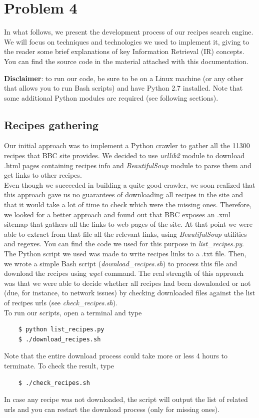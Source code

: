 
\section{Problem 4}

In what follows, we present the development process of our recipes search engine. We will focus on techniques and technologies we used to implement it, giving to the reader some brief explanations of key Information Retrieval (IR) concepts. You can find the source code in the material attached with this documentation.\medskip

\noindent\textbf{Disclaimer}: to run our code, be sure to be on a Linux machine (or any other that allows you to run Bash scripts) and have Python 2.7 installed. Note that some additional Python modules are required (see following sections).


\subsection{Recipes gathering}

Our initial approach was to implement a Python crawler to gather all the 11300 recipes that BBC site\cite{bbc} provides. We decided to use \textit{urllib2}\cite{urllib2} module to download .html pages containing recipes info and \textit{BeautifulSoup}\cite{beaut_soup} module to parse them and get links to other recipes.\\
Even though we succeeded in building a quite good crawler, we soon realized that this approach gave us no guarantees of downloading all recipes in the site and that it would take a lot of time to check which were the missing ones. Therefore, we looked for a better approach and found out that BBC exposes an .xml sitemap that gathers all the links to web pages of the site. At that point we were able to extract from that file all the relevant links, using \textit{BeautifulSoup}\cite{beaut_soup} utilities and regexes. You can find the code we used for this purpose in \textit{list\_recipes.py}.\\
The Python script we used was made to write recipes links to a .txt file. Then, we wrote a simple Bash script (\textit{download\_recipes.sh}) to process this file and download the recipes using \textit{wget} command. The real strength of this approach was that we were able to decide whether all recipes had been downloaded or not (due, for instance, to network issues) by checking downloaded files against the list of recipes urls (see \textit{check\_recipes.sh}).\\
To run our scripts, open a terminal and type
\begin{lstlisting}
	$ python list_recipes.py
	$ ./download_recipes.sh
\end{lstlisting}
Note that the entire download process could take more or less 4 hours to terminate. To check the result, type
\begin{lstlisting}
	$ ./check_recipes.sh
\end{lstlisting}
In case any recipe was not downloaded, the script will output the list of related urls and you can restart the download process (only for missing ones).


